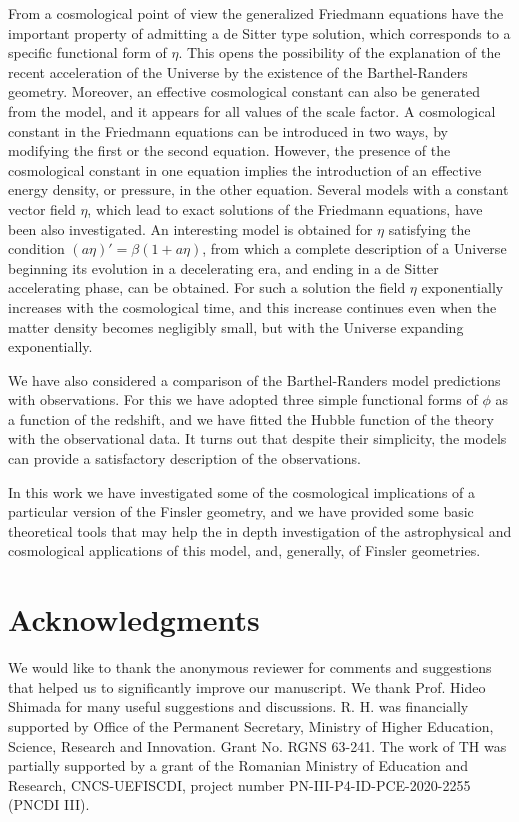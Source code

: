 \documentclass[aps,superscriptaddress, showpacs,preprintnumbers, superscriptaddress, nofootinbibt,twocolumn]{revtex4-2}
\begin{document}
From a cosmological point of view the generalized Friedmann equations have the important property of admitting a de Sitter type solution, which corresponds to a specific functional form of $\eta $. This opens the possibility of the explanation of the recent acceleration of the Universe by the existence of the Barthel-Randers geometry. Moreover, an effective cosmological constant can also be generated from the model, and it appears for all values of the scale factor. A cosmological constant in the Friedmann equations can be introduced in two ways, by modifying the first or the second  equation. However, the presence of the cosmological constant in one equation implies the introduction of an effective energy density, or pressure, in the other equation. Several models with a constant vector field $\eta$, which lead to exact solutions of the Friedmann equations, have been also investigated. An interesting model is obtained for $\eta$ satisfying the condition $(a\eta)'=\beta(1+a\eta)$, from which a complete description of a Universe beginning its evolution in a decelerating era, and ending in a de Sitter accelerating phase, can be obtained. For such a solution the field $\eta$ exponentially increases with the cosmological time, and this increase continues even when the matter density becomes negligibly small, but with the Universe expanding exponentially.

We have also considered a comparison of the Barthel-Randers model predictions with observations. For this we have adopted three simple functional forms of $\phi$ as a function of the redshift, and we have fitted the Hubble function of the theory with the observational data. It turns out that despite their simplicity,  the models can provide a satisfactory description of the observations.

In this work we have investigated some of the cosmological implications of a particular version of the Finsler geometry, and we have provided some basic theoretical tools that may help the in depth  investigation of the astrophysical and cosmological applications of this model, and, generally, of Finsler geometries.

\section{Acknowledgments}

We would like to thank the anonymous reviewer for comments and suggestions that helped us to significantly improve our manuscript. We thank Prof. Hideo Shimada for many useful suggestions and discussions. R. H. was financially supported by Office of the Permanent Secretary, Ministry of Higher Education, Science, Research and Innovation. Grant No. RGNS 63-241. The work of TH was partially supported by a grant of the Romanian Ministry of Education and
Research, CNCS-UEFISCDI, project number PN-III-P4-ID-PCE-2020-2255 (PNCDI III).
\end{document}
